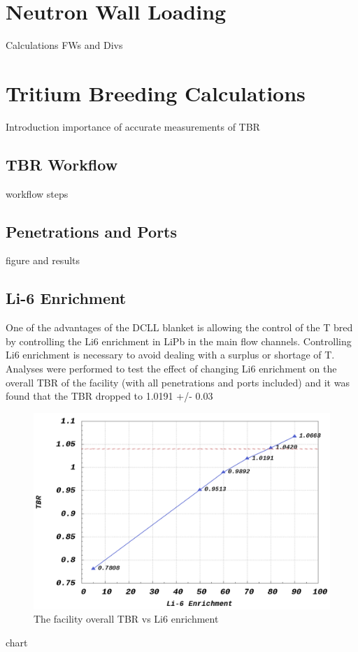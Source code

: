 \documentclass[12pt, letterpaper]{elsarticle}
\begin{document}
\section{Neutron Wall Loading}
Calculations FWs and Divs

\section{Tritium Breeding Calculations}
Introduction
importance of accurate measurements of TBR
\subsection{TBR Workflow}
workflow steps
\subsection{Penetrations and Ports}
figure and results
\subsection{Li-6 Enrichment}
One of the advantages of the DCLL blanket is allowing the control of the T bred by controlling the  Li6 enrichment in LiPb in the main flow channels. Controlling Li6 enrichment is necessary to avoid dealing with a surplus or shortage of T. Analyses were performed to test the effect of changing Li6 enrichment on the overall TBR of the facility (with all penetrations and ports included) and it was found that the TBR dropped to 1.0191 +/- 0.03%
\begin{figure}[h!]
  \centering
  \includegraphics[scale=0.25]{../plots/Li6_enrichment.png}
  \caption{The facility overall TBR vs Li6 enrichment}
  \label{fig:Li6_enrichment}
\end{figure}
chart
\end{document}
